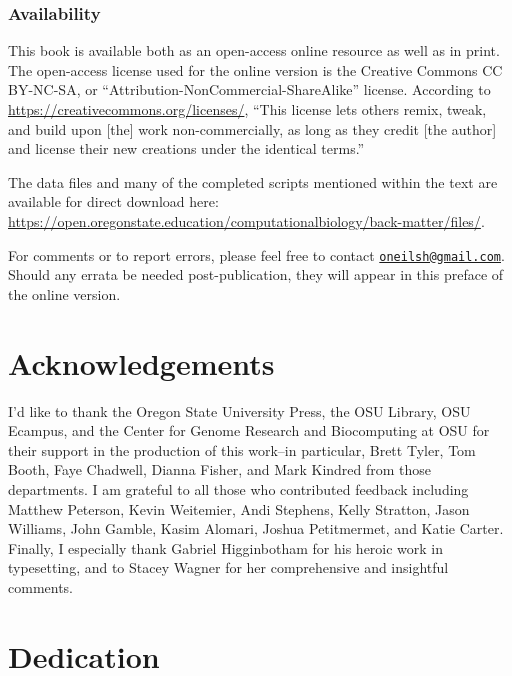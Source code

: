\documentclass[
]{memoir}
\begin{document}
\hypertarget{availability}{%
\subsection*{Availability}\label{availability}}

This book is available both as an open-access online resource as well as in print. The open-access license used for the online version is the Creative Commons CC BY-NC-SA, or \enquote{Attribution-NonCommercial-ShareAlike} license. According to \url{https://creativecommons.org/licenses/}, \enquote{This license lets others remix, tweak, and build upon {[}the{]} work non-commercially, as long as they credit {[}the author{]} and license their new creations under the identical terms.}

The data files and many of the completed scripts mentioned within the text are available for direct download here: \url{https://open.oregonstate.education/computationalbiology/back-matter/files/}.

For comments or to report errors, please feel free to contact \href{mailto:oneilsh@gmail.com}{\nolinkurl{oneilsh@gmail.com}}. Should any errata be needed post-publication, they will appear in this preface of the online version.

\hypertarget{acknowledgements}{%
\chapter*{Acknowledgements}\label{acknowledgements}}

I'd like to thank the Oregon State University Press, the OSU Library, OSU Ecampus, and the Center for Genome Research and Biocomputing at OSU for their support in the production of this work--in particular, Brett Tyler, Tom Booth, Faye Chadwell, Dianna Fisher, and Mark Kindred from those departments. I am grateful to all those who contributed feedback including Matthew Peterson, Kevin Weitemier, Andi Stephens, Kelly Stratton, Jason Williams, John Gamble, Kasim Alomari, Joshua Petitmermet, and Katie Carter. Finally, I especially thank Gabriel Higginbotham for his heroic work in typesetting, and to Stacey Wagner for her comprehensive and insightful comments.

\hypertarget{dedication}{%
\chapter*{Dedication}\label{dedication}}
\end{document}
